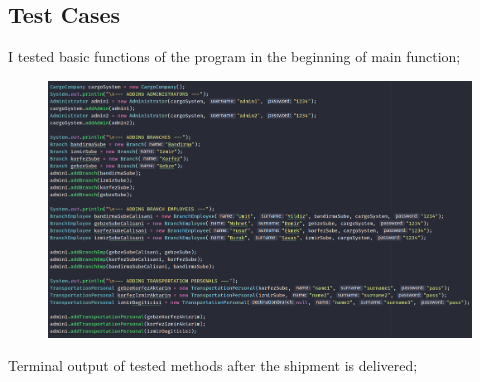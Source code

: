 \documentclass[a4paper]{article}
\begin{document}
\begin{Large}
\newpage

\section{Test Cases}

I tested basic functions of the program in the beginning of main function;

\begin{figure}[htp]
	\centering
	\includegraphics[width=\textwidth]{test-cases-main}
\end{figure}

Terminal output of tested methods after the shipment is delivered;


\end{Large}
\end{document}
